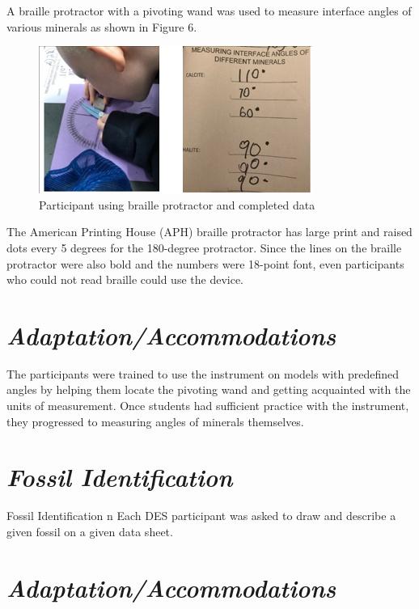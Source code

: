 \documentclass[11.5pt]{sig-alternate}
\begin{document}
\begin{large}
A braille protractor with a pivoting wand was used to measure interface angles of various minerals as shown in Figure 6. 

\begin{figure}[htp] 
  \renewcommand{\thefigure}{6}
    \centering
    \includegraphics[width=8 cm]{figure6.png}
    \caption{Participant using braille protractor and completed data  }
    \label{ participant using braille protractor and completed data  }
\end{figure}

The American Printing House (APH) braille protractor has large print and raised dots every 5 degrees for the 180-degree protractor. Since the lines on the braille protractor were also bold and the numbers were 18-point font, even participants who could not read braille could use the device. 
\section*{\textit{Adaptation/Accommodations}}
The participants were trained to use the instrument on models with predefined angles by helping them locate the pivoting wand and getting acquainted with the units of measurement. Once students had sufficient practice with the instrument, they progressed to measuring angles of minerals themselves. 
\section*{\textit{Fossil Identification}}Fossil Identification
n Each DES participant was asked to draw and describe a given fossil on a given data sheet. 

\section*{\textit{Adaptation/Accommodations}}


\end{large}
\end{document}
